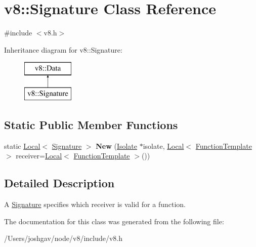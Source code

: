 \hypertarget{classv8_1_1_signature}{}\section{v8\+:\+:Signature Class Reference}
\label{classv8_1_1_signature}


{\ttfamily \#include $<$v8.\+h$>$}

Inheritance diagram for v8\+:\+:Signature\+:\begin{figure}[H]
\begin{center}
\leavevmode
\includegraphics[height=2.000000cm]{classv8_1_1_signature}
\end{center}
\end{figure}
\subsection*{Static Public Member Functions}
\begin{DoxyCompactItemize}
\item 
static \hyperlink{classv8_1_1_local}{Local}$<$ \hyperlink{classv8_1_1_signature}{Signature} $>$ {\bfseries New} (\hyperlink{classv8_1_1_isolate}{Isolate} $\ast$isolate, \hyperlink{classv8_1_1_local}{Local}$<$ \hyperlink{classv8_1_1_function_template}{Function\+Template} $>$ receiver=\hyperlink{classv8_1_1_local}{Local}$<$ \hyperlink{classv8_1_1_function_template}{Function\+Template} $>$())\hypertarget{classv8_1_1_signature_a4e3d622674ec1f735e9981ec3309320f}{}\label{classv8_1_1_signature_a4e3d622674ec1f735e9981ec3309320f}

\end{DoxyCompactItemize}


\subsection{Detailed Description}
A \hyperlink{classv8_1_1_signature}{Signature} specifies which receiver is valid for a function. 

The documentation for this class was generated from the following file\+:\begin{DoxyCompactItemize}
\item 
/\+Users/joshgav/node/v8/include/v8.\+h\end{DoxyCompactItemize}
